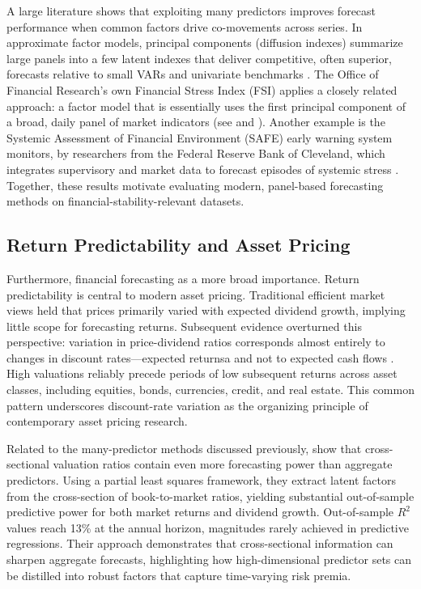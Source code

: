 \documentclass{article}
\begin{document}
A large literature shows that exploiting many predictors improves forecast performance when common factors drive co-movements across series. In approximate factor models, principal components (diffusion indexes) summarize large panels into a few latent indexes that deliver competitive, often superior, forecasts relative to small VARs and univariate benchmarks \citep{Stock2002,Stock2002a,Stock}. The Office of Financial Research's own Financial Stress Index (FSI) applies a closely related approach: a factor model that is essentially uses the first principal component of a broad, daily panel of market indicators (see \citet{Monin2019} and \citep{Bejarano2023}). Another example is the Systemic Assessment of Financial Environment (SAFE) early warning system monitors, by researchers from the Federal Reserve Bank of Cleveland, which integrates supervisory and market data to forecast episodes of systemic stress \citep{Oet2011}. Together, these results motivate evaluating modern, panel-based forecasting methods on financial-stability-relevant datasets.

\subsection{Return Predictability and Asset Pricing}

Furthermore, financial forecasting as a more broad importance. Return predictability is central to modern asset pricing. Traditional efficient market views held that prices primarily varied with expected dividend growth, implying little scope for forecasting returns. Subsequent evidence overturned this perspective: variation in price-dividend ratios corresponds almost entirely to changes in discount rates—expected returnsa and not to expected cash flows \citep{Cochrane2011}. High valuations reliably precede periods of low subsequent returns across asset classes, including equities, bonds, currencies, credit, and real estate. This common pattern underscores discount-rate variation as the organizing principle of contemporary asset pricing research.

Related to the many-predictor methods discussed previously, \citet{Kelly2013} show that cross-sectional valuation ratios contain even more forecasting power than aggregate predictors. Using a partial least squares framework, they extract latent factors from the cross-section of book-to-market ratios, yielding substantial out-of-sample predictive power for both market returns and dividend growth. Out-of-sample $R^2$ values reach 13\% at the annual horizon, magnitudes rarely achieved in predictive regressions. Their approach demonstrates that cross-sectional information can sharpen aggregate forecasts, highlighting how high-dimensional predictor sets can be distilled into robust factors that capture time-varying risk premia.
\end{document}
